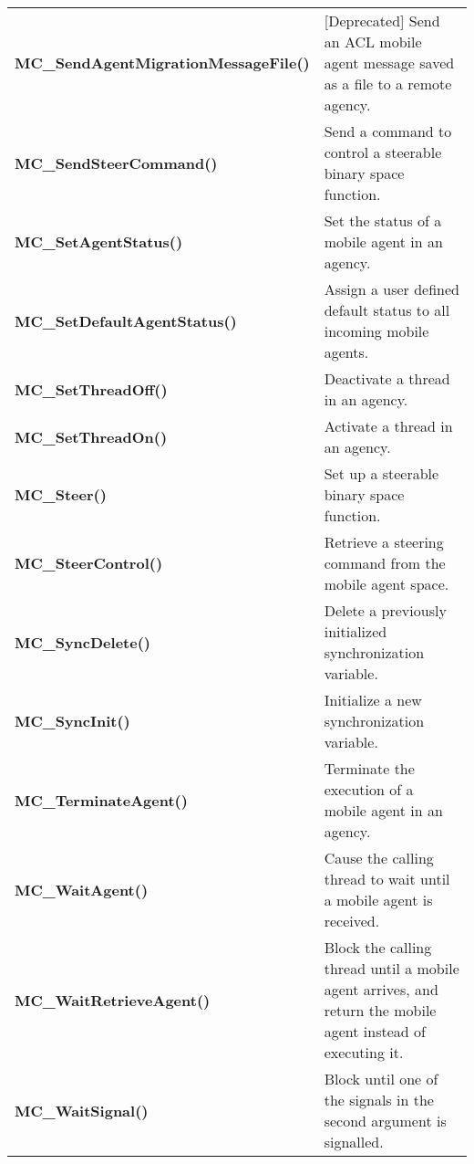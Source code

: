 \begin{table}[!hp]
\begin{center}
\begin{tabular}{p{63 mm}p{97 mm}}
{\bf MC\_SendAgentMigrationMessageFile()} \dotfill & [Deprecated] Send an ACL mobile agent message saved as a file to a remote agency. \\
{\bf MC\_SendSteerCommand()} \dotfill & Send a command to control a steerable binary space function. \\
{\bf MC\_SetAgentStatus()} \dotfill & Set the status of a mobile agent in an agency. \\
{\bf MC\_SetDefaultAgentStatus()} \dotfill & Assign a user defined default status to all incoming mobile agents. \\
{\bf MC\_SetThreadOff()} \dotfill & Deactivate a thread in an agency. \\
{\bf MC\_SetThreadOn()} \dotfill & Activate a thread in an agency. \\
{\bf MC\_Steer()} \dotfill & Set up a steerable binary space function. \\
{\bf MC\_SteerControl()} \dotfill & Retrieve a steering command from the mobile agent space. \\
{\bf MC\_SyncDelete()} \dotfill & Delete a previously initialized synchronization variable. \\
{\bf MC\_SyncInit()} \dotfill & Initialize a new synchronization variable. \\
{\bf MC\_TerminateAgent()} \dotfill & Terminate the execution of a mobile agent in an agency. \\
{\bf MC\_WaitAgent()} \dotfill & Cause the calling thread to wait until a mobile agent is received. \\
{\bf MC\_WaitRetrieveAgent()} \dotfill & Block the calling thread until a mobile agent arrives, and return the mobile agent instead of executing it. \\
{\bf MC\_WaitSignal()} \dotfill & Block until one of the signals in the second argument is signalled.\\
\hline
\end{tabular}
\end{center}
\end{table}
\pagebreak

